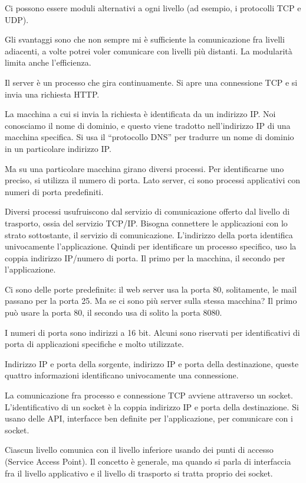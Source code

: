 Ci possono essere moduli alternativi a ogni livello (ad esempio, i protocolli TCP e UDP).

Gli svantaggi sono che non sempre mi \`e sufficiente la comunicazione fra livelli adiacenti, a volte potrei voler comunicare con livelli pi\`u distanti. La modularit\`a limita anche l'efficienza.



Il server \`e un processo che gira continuamente. Si apre una connessione TCP e si invia una richiesta HTTP.

La macchina a cui si invia la richiesta \`e identificata da un indirizzo IP. Noi conosciamo il nome di dominio, e questo viene tradotto nell'indirizzo IP di una macchina specifica. Si usa il ``protocollo DNS'' per tradurre un nome di dominio in un particolare indirizzo IP.

Ma su una particolare macchina girano diversi processi. Per identificarne uno preciso, si utilizza il numero di porta. Lato server, ci sono processi applicativi con numeri di porta predefiniti.

Diversi processi usufruiscono dal servizio di comunicazione offerto dal livello di trasporto, ossia del servizio TCP/IP. Bisogna connettere le applicazioni con lo strato sottostante, il servizio di comunicazione. L'indirizzo della porta identifica univocamente l'applicazione. Quindi per identificare un processo specifico, uso la coppia indirizzo IP/numero di porta. Il primo per la macchina, il secondo per l'applicazione.

Ci sono delle porte predefinite: il web server usa la porta 80, solitamente, le mail passano per la porta 25. Ma se ci sono pi\`u server sulla stessa macchina? Il primo pu\`o usare la porta 80, il secondo usa di solito la porta 8080.

I numeri di porta sono indirizzi a 16 bit. Alcuni sono riservati per identificativi di porta di applicazioni specifiche e molto utilizzate.

Indirizzo IP e porta della sorgente, indirizzo IP e porta della destinazione, queste quattro informazioni identificano univocamente una connessione.

La comunicazione fra processo e connessione TCP avviene attraverso un socket. L'identificativo di un socket \`e la coppia indirizzo IP e porta della destinazione. Si usano delle API, interfacce ben definite per l'applicazione, per comunicare con i socket.

Ciascun livello comunica con il livello inferiore usando dei punti di accesso (Service Access Point). Il concetto \`e generale, ma quando si parla di interfaccia fra il livello applicativo e il livello di trasporto si tratta proprio dei socket.

